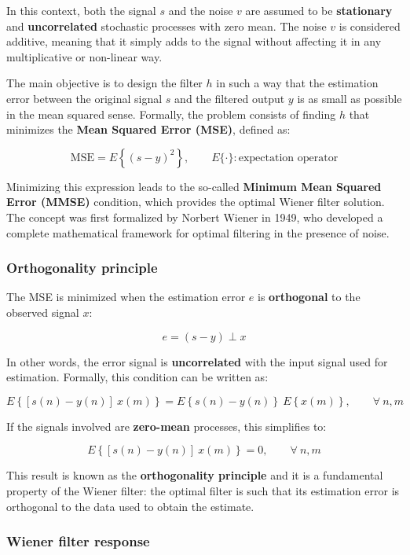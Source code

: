 In this context, both the signal $s$ and the noise $v$ are assumed to be \textbf{stationary} and \textbf{uncorrelated} stochastic processes with zero mean.  
The noise $v$ is considered additive, meaning that it simply adds to the signal without affecting it in any multiplicative or non-linear way.

The main objective is to design the filter $h$ in such a way that the estimation error between the original signal $s$ and the filtered output $y$ is as small as possible in the mean squared sense.  
Formally, the problem consists of finding $h$ that minimizes the \textbf{Mean Squared Error (MSE)}, defined as:

\[
\mathrm{MSE} = E\left\{ (s - y)^2 \right\},
\qquad
E\{\cdot\}: \text{expectation operator}
\]

Minimizing this expression leads to the so-called \textbf{Minimum Mean Squared Error (MMSE)} condition, which provides the optimal Wiener filter solution.
The concept was first formalized by Norbert Wiener in 1949, who developed a complete mathematical framework for optimal filtering in the presence of noise.

\clearpage

\subsubsection{Orthogonality principle}

The MSE is minimized when the estimation error $e$ is \textbf{orthogonal} to the observed signal $x$:

\[
e = (s - y) \perp x
\]

In other words, the error signal is \textbf{uncorrelated} with the input signal used for estimation.  
Formally, this condition can be written as:

\[
E\left\{ \left[ s(n) - y(n) \right] \ x(m) \right\} = E\left\{ s(n) - y(n) \right\} \ E \left\{ x(m) \right\},
\qquad
\forall \ n, m
\]

If the signals involved are \textbf{zero-mean} processes, this simplifies to:

\[
E\left\{ \left[ s(n) - y(n) \right] \ x(m) \right\} = 0,
\qquad
\forall \ n, m
\]

This result is known as the \textbf{orthogonality principle} and it is a fundamental property of the Wiener filter: the optimal filter is such that its estimation error is orthogonal to the data used to obtain the estimate.

\subsubsection{Wiener filter response}

